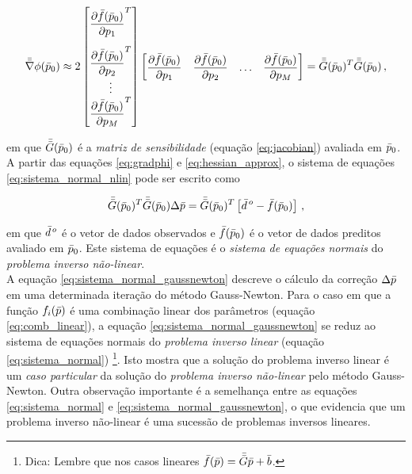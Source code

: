 \begin{equation}
\mat{\nabla}\phi(\vect{p}_0) \approx
    2
    \begin{bmatrix}
    \dfrac{\partial\vect{f}(\vect{p}_0)}{\partial p_1}^T \vspace{0.3cm}\\
    \dfrac{\partial\vect{f}(\vect{p}_0)}{\partial p_2}^T \\
    \vdots \\
    \dfrac{\partial\vect{f}(\vect{p}_0)}{\partial p_M}^T
    \end{bmatrix}
    \begin{bmatrix}
    \dfrac{\partial\vect{f}(\vect{p}_0)}{\partial p_1} &
    \dfrac{\partial\vect{f}(\vect{p}_0)}{\partial p_2} &
    \ldots &
    \dfrac{\partial\vect{f}(\vect{p}_0)}{\partial p_M}
    \end{bmatrix}
    =
    \mat{G}(\vect{p}_0)^T\mat{G}(\vect{p}_0) \thinspace ,
\label{eq:hessian_approx}
\end{equation}

\noindent em que $\bar{\bar{G}}(\bar{p}_0)$ é a {\it matriz de sensibilidade}
(equação \ref{eq:jacobian}) avaliada em $\bar{p}_0$.
\\
\indent A partir das equações \ref{eq:gradphi} e \ref{eq:hessian_approx}, o
sistema de equações \ref{eq:sistema_normal_nlin} pode ser escrito como

\begin{equation}
    \bar{\bar{G}}(\bar{p}_0)^T\bar{\bar{G}}(\bar{p}_0)\Delta\bar{p} =
        \bar{\bar{G}}(\bar{p}_0)^T \left[
            \bar{d}^{\thinspace o} - \bar{f}(\bar{p}_0) \right]
    \thinspace ,
\label{eq:sistema_normal_gaussnewton}
\end{equation}

\noindent em que $\bar{d}^{\thinspace o}$ é o vetor de dados observados e
$\bar{f}(\bar{p}_0)$ é o vetor de dados preditos avaliado em $\bar{p}_0$.
Este sistema de equações é o {\it sistema de equações normais} do
{\it problema inverso não-linear}.
\\
\indent A equação \ref{eq:sistema_normal_gaussnewton} descreve o cálculo da
correção $\Delta\bar{p}$ em uma determinada iteração do método Gauss-Newton.
Para o caso em que a função $f_i(\bar{p})$ é uma combinação linear dos
parâmetros (equação \ref{eq:comb_linear}), a equação
\ref{eq:sistema_normal_gaussnewton} se reduz ao sistema de equações
normais do {\it problema inverso linear} (equação \ref{eq:sistema_normal})
\footnote{Dica: Lembre que nos casos lineares $\bar{f}(\bar{p})=\bar{\bar{G}}\bar{p}+\bar{b}$.}.
Isto mostra que a solução do problema inverso linear é um {\it caso particular}
da solução do {\it problema inverso não-linear} pelo método Gauss-Newton.
Outra observação importante é a semelhança entre as equações
\ref{eq:sistema_normal} e \ref{eq:sistema_normal_gaussnewton}, o que evidencia
que um problema inverso não-linear é uma sucessão de problemas inversos lineares.

